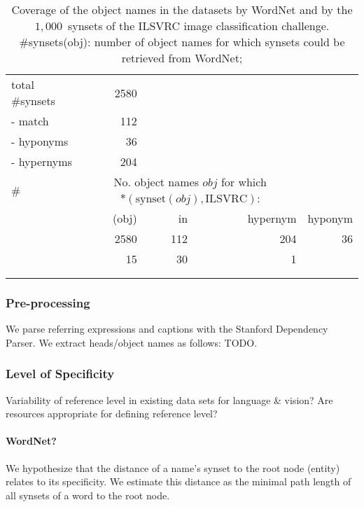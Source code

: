 {\begin{table}[t]
	\begin{tabular}{lrrrr}
		\hline
			 			& \refcoco &  & \flickr & \vgenome \\
		\hline \hline
		total \#synsets	&	2580\\
		- match			&	112 \\
		- hyponyms		&	36 \\
		- hypernyms 	&	204 \\
		\hline
		\# 
				& \multicolumn{3}{c}{No. object names $obj$ for which $*(\text{synset}(obj), \text{ILSVRC})$:} \\
				& (obj)
				& in
				& hypernym
				& hyponym\\
		\hline \hline
		 	& 2580 & 112 & 204 & 36\\
		 	& 15 & 30 & 1 \cs{??}\\
		 	& \\
		\vgenome 	& \\
		\hline
	\end{tabular}
	\caption{Coverage of the object names in the datasets by WordNet and by the $1,000$~synsets of the ILSVRC image classification challenge. \#synsets(obj): number of object names for which synsets could be retrieved from WordNet;   \label{tab:coverage_ilsvrc}}
\end{table}


\subsubsection{Pre-processing}
We parse referring expressions and captions with the Stanford Dependency Parser.
We extract heads/object names as follows: TODO.

\subsubsection{Level of Specificity} 
Variability of reference level in existing data sets for language \& vision?
Are resources appropriate for defining reference level?
\paragraph{WordNet?}

We hypothesize that the distance of a name's synset to the root node (entity) relates to its specificity.
We estimate this distance as the minimal path length of all synsets of a word  to the root node.

}
